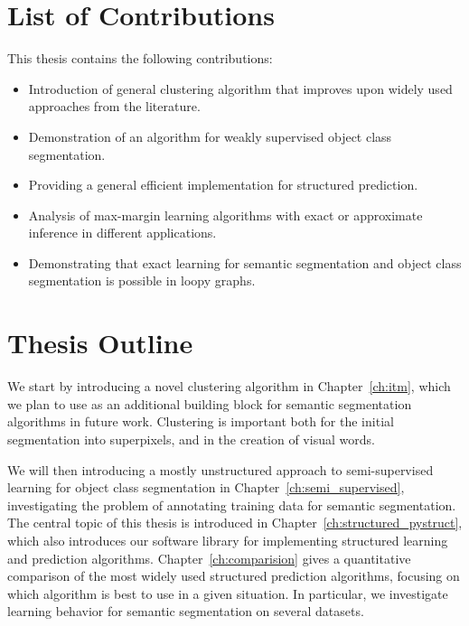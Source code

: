 

%
%

\section{List of Contributions}
This thesis contains the following contributions:
\begin{itemize}
\item Introduction of general clustering algorithm that improves upon widely used
    approaches from the literature.
\item Demonstration of an algorithm for  weakly supervised object class segmentation.
\item Providing a general efficient implementation for structured prediction.
\item Analysis of max-margin learning algorithms with exact or approximate inference in different applications.
\item Demonstrating that exact learning for semantic segmentation and object class segmentation is possible in loopy graphs.
\end{itemize}

\section{Thesis Outline}
We start by introducing a novel clustering algorithm in Chapter~\ref{ch:itm},
which we plan to use as an additional building block for semantic segmentation
algorithms in future work. Clustering is important both for the initial
segmentation into superpixels, and in the creation of visual words.

We will then introducing a mostly unstructured
approach to semi-supervised learning for object class segmentation in
Chapter~\ref{ch:semi_supervised}, investigating the problem of annotating
training data for semantic segmentation. The central topic of this thesis is
introduced in Chapter~\ref{ch:structured_pystruct}, which also introduces our
software library for implementing structured learning and prediction
algorithms.
Chapter~\ref{ch:comparision} gives a quantitative comparison of the most widely
used structured prediction algorithms, focusing on which algorithm is best to
use in a given situation. In particular, we investigate learning behavior for
semantic segmentation on several datasets.

